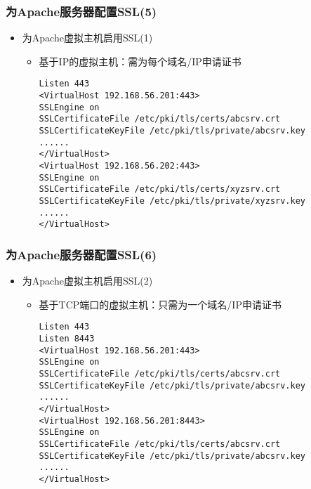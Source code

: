 \documentclass[xcolor=svgnames,presentation]{beamer}
\begin{document}
\begin{frame}[fragile]
\frametitle{为Apache服务器配置SSL(5)}
\label{sec-4-9}
\begin{itemize}

\item 为Apache虚拟主机启用SSL(1)
\label{sec-4-9-1}%
\begin{itemize}

\item 基于IP的虚拟主机：需为每个域名/IP申请证书\\
\label{sec-4-9-1-1}%
\begin{verbatim}
Listen 443
<VirtualHost 192.168.56.201:443>
SSLEngine on
SSLCertificateFile /etc/pki/tls/certs/abcsrv.crt
SSLCertificateKeyFile /etc/pki/tls/private/abcsrv.key
......
</VirtualHost>
<VirtualHost 192.168.56.202:443>
SSLEngine on
SSLCertificateFile /etc/pki/tls/certs/xyzsrv.crt
SSLCertificateKeyFile /etc/pki/tls/private/xyzsrv.key
......
</VirtualHost>
\end{verbatim}
\end{itemize} %
\end{itemize} %
\end{frame}
\begin{frame}[fragile]
\frametitle{为Apache服务器配置SSL(6)}
\label{sec-4-10}
\begin{itemize}

\item 为Apache虚拟主机启用SSL(2)
\label{sec-4-10-1}%
\begin{itemize}

\item 基于TCP端口的虚拟主机：只需为一个域名/IP申请证书\\
\label{sec-4-10-1-1}%
\begin{verbatim}
Listen 443
Listen 8443
<VirtualHost 192.168.56.201:443>
SSLEngine on
SSLCertificateFile /etc/pki/tls/certs/abcsrv.crt
SSLCertificateKeyFile /etc/pki/tls/private/abcsrv.key
......
</VirtualHost>
<VirtualHost 192.168.56.201:8443>
SSLEngine on
SSLCertificateFile /etc/pki/tls/certs/abcsrv.crt
SSLCertificateKeyFile /etc/pki/tls/private/abcsrv.key
......
</VirtualHost>
\end{verbatim}
\end{itemize} %
\end{itemize} %
\end{frame}
\end{document}
